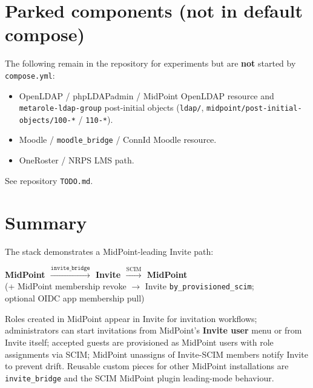 \documentclass[11pt,a4paper]{article}
\begin{document}
\section{Parked components (not in default compose)}
\label{sec:parked}

The following remain in the repository for experiments but are \textbf{not}
started by \texttt{compose.yml}:

\begin{itemize}[leftmargin=*]
  \item OpenLDAP / phpLDAPadmin / MidPoint OpenLDAP resource and
        \texttt{metarole-ldap-group} post-initial objects (\texttt{ldap/},
        \texttt{midpoint/post-initial-objects/100-*} / \texttt{110-*}).
  \item Moodle / \texttt{moodle\_bridge} / ConnId Moodle resource.
  \item OneRoster / NRPS LMS path.
\end{itemize}

See repository \texttt{TODO.md}.

\section{Summary}

The stack demonstrates a MidPoint-leading Invite path:

\begin{center}
\textbf{MidPoint $\xrightarrow{\texttt{invite\_bridge}}$ Invite $\xrightarrow{\mathrm{SCIM}}$ MidPoint}\\[0.4em]
\small (+ MidPoint membership revoke $\rightarrow$ Invite \texttt{by\_provisioned\_scim};\\
optional OIDC app membership pull)
\end{center}

Roles created in MidPoint appear in Invite for invitation workflows; administrators
can start invitations from MidPoint's \textbf{Invite user} menu or from Invite
itself; accepted guests are provisioned as MidPoint users with role assignments
via SCIM; MidPoint unassigns of Invite-SCIM members notify Invite to prevent
drift. Reusable custom pieces for other MidPoint installations are
\texttt{invite\_bridge} and the SCIM MidPoint plugin leading-mode behaviour.
\end{document}
